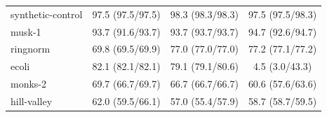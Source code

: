 \begin{table}
\begin{small}
\begin{tabular}{lccc}
			synthetic-control    & 97.5 (97.5/97.5) & 98.3 (98.3/98.3)         & 97.5 (97.5/98.3)        \\
			musk-1               & 93.7 (91.6/93.7) & 93.7 (93.7/93.7)         & 94.7 (92.6/94.7)        \\
			ringnorm             & 69.8 (69.5/69.9) & 77.0 (77.0/77.0)         & 77.2 (77.1/77.2)        \\
			ecoli                & 82.1 (82.1/82.1) & 79.1 (79.1/80.6)         & 4.5 (3.0/43.3)          \\
			monks-2              & 69.7 (66.7/69.7) & 66.7 (66.7/66.7)         & 60.6 (57.6/63.6)        \\
			hill-valley          & 62.0 (59.5/66.1) & 57.0 (55.4/57.9)         & 58.7 (58.7/59.5)        \\ \bottomrule
		\end{tabular}
	\end{small}
\end{table}
